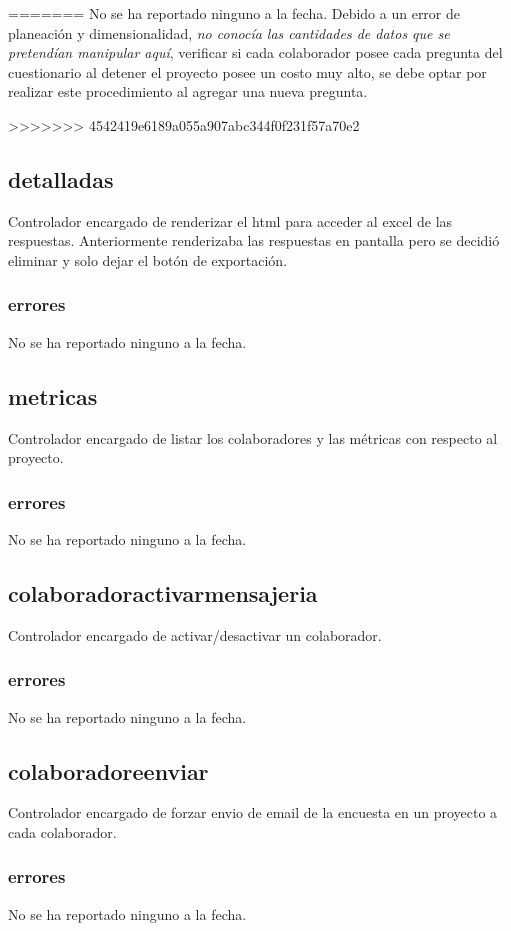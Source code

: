 \documentclass[10pt,a4paper]{book}
\begin{document}
=======
	No se ha reportado ninguno a la fecha. Debido a un error de planeación y dimensionalidad, \textit{no conocía las cantidades de datos que se pretendían manipular aquí}, verificar si cada colaborador posee cada pregunta del cuestionario al detener el proyecto posee un costo muy alto, se debe optar por realizar este procedimiento al agregar una nueva pregunta.
	
>>>>>>> 4542419e6189a055a907abc344f0f231f57a70e2
	\subsection{detalladas}
	Controlador encargado de renderizar el html para acceder al excel de las respuestas. Anteriormente renderizaba las respuestas en pantalla pero se decidió eliminar y solo dejar el botón  de exportación.
	\subsubsection{errores}
	No se ha reportado ninguno a la fecha.

	\subsection{metricas}
	Controlador encargado de listar los colaboradores y las métricas con respecto al proyecto.
	\subsubsection{errores}
	No se ha reportado ninguno a la fecha.

	\subsection{colaboradoractivarmensajeria}
	Controlador encargado de activar/desactivar un colaborador.
	\subsubsection{errores}
	No se ha reportado ninguno a la fecha.

	\subsection{colaboradoreenviar}
	Controlador encargado de forzar envio de email de la encuesta en un proyecto a cada colaborador.
	\subsubsection{errores}
	No se ha reportado ninguno a la fecha.
\end{document}

